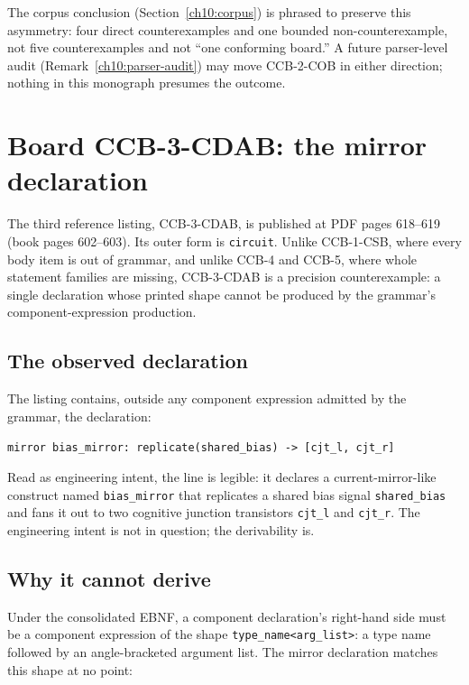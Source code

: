 The corpus conclusion (Section~\ref{ch10:corpus}) is phrased to preserve this asymmetry: four direct counterexamples and one bounded non-counterexample, not five counterexamples and not ``one conforming board.'' A future parser-level audit (Remark~\ref{ch10:parser-audit}) may move CCB-2-COB in either direction; nothing in this monograph presumes the outcome.

\section{Board CCB-3-CDAB: the mirror declaration}\label{ch10:ccb3}

The third reference listing, CCB-3-CDAB, is published at PDF pages 618--619 (book pages 602--603). Its outer form is \texttt{circuit}. Unlike CCB-1-CSB, where every body item is out of grammar, and unlike CCB-4 and CCB-5, where whole statement families are missing, CCB-3-CDAB is a precision counterexample: a single declaration whose printed shape cannot be produced by the grammar's component-expression production.

\subsection{The observed declaration}

The listing contains, outside any component expression admitted by the grammar, the declaration:

\begin{center}
\texttt{mirror bias\_mirror: replicate(shared\_bias) -> [cjt\_l, cjt\_r]}
\end{center}

Read as engineering intent, the line is legible: it declares a current-mirror-like construct named \texttt{bias\_mirror} that replicates a shared bias signal \texttt{shared\_bias} and fans it out to two cognitive junction transistors \texttt{cjt\_l} and \texttt{cjt\_r}. The engineering intent is not in question; the derivability is.

\subsection{Why it cannot derive}

Under the consolidated EBNF, a component declaration's right-hand side must be a component expression of the shape \texttt{type\_name<arg\_list>}: a type name followed by an angle-bracketed argument list. The mirror declaration matches this shape at no point:

